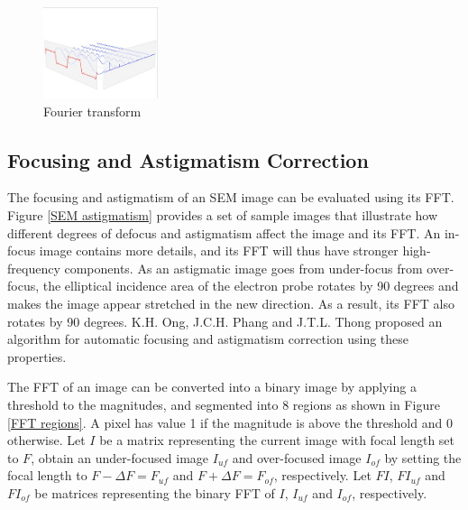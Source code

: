 \documentclass{article}
\begin{document}
\begin{figure}
    \centering
    \includegraphics[width=0.3\textwidth]{Images/FT.jpg}
    \caption{Fourier transform \cite{Fourier transform wiki}}
    \label{FT}
\end{figure}

\subsection{Focusing and Astigmatism Correction}
The focusing and astigmatism of an SEM image can be evaluated using its FFT. Figure \ref{SEM astigmatism} provides a set of sample images that illustrate how different degrees of defocus and astigmatism affect the image and its FFT. An in-focus image contains more details, and its FFT will thus have stronger high-frequency components. As an astigmatic image goes from under-focus from over-focus, the elliptical incidence area of the electron probe rotates by 90 degrees and makes the image appear stretched in the new direction. As a result, its FFT also rotates by 90 degrees. K.H. Ong, J.C.H. Phang and J.T.L. Thong proposed an algorithm for automatic focusing and astigmatism correction \cite{SEM astigmatation correction algorithm} using these properties.

The FFT of an image can be converted into a binary image by applying a threshold to the magnitudes, and segmented into 8 regions as shown in Figure \ref{FFT regions}. A pixel has value 1 if the magnitude is above the threshold and 0 otherwise. Let $I$ be a matrix representing the current image with focal length set to $F$, obtain an under-focused image $I_{uf}$ and over-focused image $I_{of}$ by setting the focal length to $F-\Delta F=F_{uf}$ and $F+\Delta F=F_{of}$, respectively. Let $FI$, $FI_{uf}$ and $FI_{of}$ be matrices representing the binary FFT of $I$, $I_{uf}$ and $I_{of}$, respectively.
\end{document}
